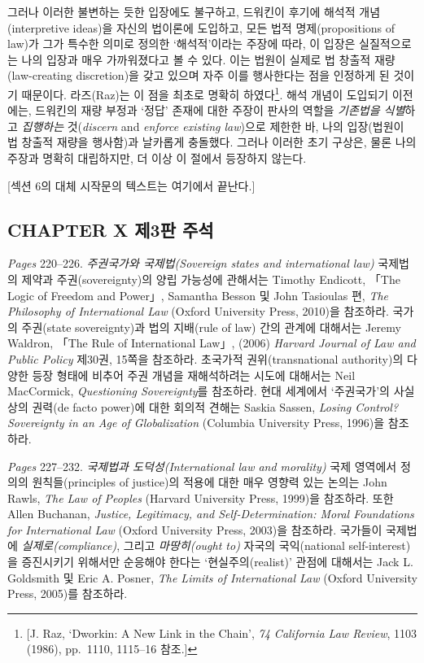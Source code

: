 {그러나 이러한 불변하는 듯한 입장에도 불구하고, 드워킨이 후기에 해석적
개념(interpretive ideas)을 자신의 법이론에 도입하고, 모든 법적
명제(propositions of law)가 그가 특수한 의미로 정의한 `해석적'이라는
주장에 따라, 이 입장은 실질적으로는 나의 입장과 매우 가까워졌다고 볼 수
있다. 이는 법원이 실제로 법 창출적 재량(law-creating discretion)을 갖고
있으며 자주 이를 행사한다는 점을 인정하게 된 것이기 때문이다.
라즈(Raz)는 이 점을 최초로 명확히 하였다\footnote{{[}J. Raz, `Dworkin: A
  New Link in the Chain', \emph{74 California Law Review}, 1103 (1986),
  pp.~1110, 1115--16 참조.{]}}. 해석 개념이 도입되기 이전에는, 드워킨의
재량 부정과 `정답' 존재에 대한 주장이 판사의 역할을 \emph{기존법을
식별}하고 \emph{집행하는} 것(\emph{discern} and \emph{enforce existing
law})으로 제한한 바, 나의 입장(법원이 법 창출적 재량을 행사함)과
날카롭게 충돌했다. 그러나 이러한 초기 구상은, 물론 나의 주장과 명확히
대립하지만, 더 이상 이 절에서 등장하지 않는다.

{[}섹션 6의 대체 시작문의 텍스트는 여기에서 끝난다.{]}

\subsection{CHAPTER X 제3판
주석}\label{chapter-x-uxc81c3uxd310-uxc8fcuxc11d}

\emph{Pages} 220--226. \emph{주권국가와 국제법(Sovereign states and
international law)} 국제법의 제약과 주권(sovereignty)의 양립 가능성에
관해서는 Timothy Endicott, 「The Logic of Freedom and Power」, Samantha
Besson 및 John Tasioulas 편, \emph{The Philosophy of International Law}
(Oxford University Press, 2010)을 참조하라. 국가의 주권(state
sovereignty)과 법의 지배(rule of law) 간의 관계에 대해서는 Jeremy
Waldron, 「The Rule of International Law」, (2006) \emph{Harvard Journal
of Law and Public Policy} 제30권, 15쪽을 참조하라. 초국가적
권위(transnational authority)의 다양한 등장 형태에 비추어 주권 개념을
재해석하려는 시도에 대해서는 Neil MacCormick, \emph{Questioning
Sovereignty}를 참조하라. 현대 세계에서 `주권국가'의 사실상의 권력(de
facto power)에 대한 회의적 견해는 Saskia Sassen, \emph{Losing Control?
Sovereignty in an Age of Globalization} (Columbia University Press,
1996)을 참조하라.

\emph{Pages} 227--232. \emph{국제법과 도덕성(International law and
morality)} 국제 영역에서 정의의 원칙들(principles of justice)의 적용에
대한 매우 영향력 있는 논의는 John Rawls, \emph{The Law of Peoples}
(Harvard University Press, 1999)을 참조하라. 또한 Allen Buchanan,
\emph{Justice, Legitimacy, and Self-Determination: Moral Foundations for
International Law} (Oxford University Press, 2003)을 참조하라. 국가들이
국제법에 \emph{실제로(compliance)}, 그리고 \emph{마땅히(ought to)}
자국의 국익(national self-interest)을 증진시키기 위해서만 순응해야
한다는 `현실주의(realist)' 관점에 대해서는 Jack L. Goldsmith 및 Eric A.
Posner, \emph{The Limits of International Law} (Oxford University Press,
2005)를 참조하라.

}
